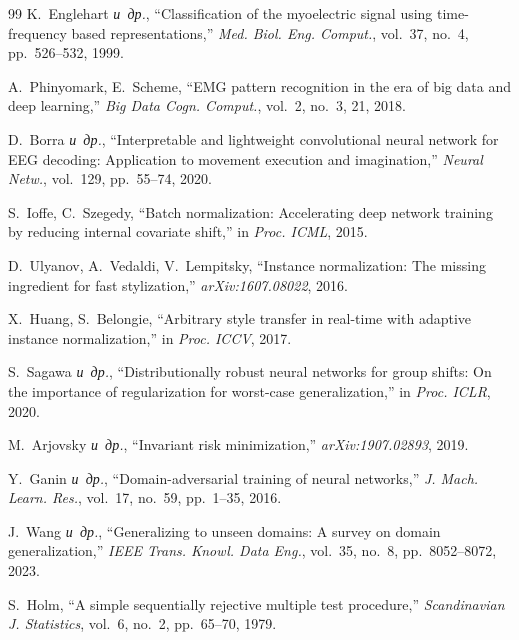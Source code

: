 \documentclass[conference]{IEEEtran}
\newcommand{\etal}{\mbox{\textit{и~др.}}}
\begin{document}
\begin{thebibliography}{99}
K.~Englehart \etal, ``Classification of the myoelectric signal using time-frequency based representations,'' \textit{Med. Biol. Eng. Comput.}, vol.~37, no.~4, pp.~526--532, 1999.

A.~Phinyomark, E.~Scheme, ``EMG pattern recognition in the era of big data and deep learning,'' \textit{Big Data Cogn. Comput.}, vol.~2, no.~3, 21, 2018.

D.~Borra \etal, ``Interpretable and lightweight convolutional neural network for EEG decoding: Application to movement execution and imagination,'' \textit{Neural Netw.}, vol.~129, pp.~55--74, 2020.

S.~Ioffe, C.~Szegedy, ``Batch normalization: Accelerating deep network training by reducing internal covariate shift,'' in \textit{Proc. ICML}, 2015.

D.~Ulyanov, A.~Vedaldi, V.~Lempitsky, ``Instance normalization: The missing ingredient for fast stylization,'' \textit{arXiv:1607.08022}, 2016.

X.~Huang, S.~Belongie, ``Arbitrary style transfer in real-time with adaptive instance normalization,'' in \textit{Proc. ICCV}, 2017.

S.~Sagawa \etal, ``Distributionally robust neural networks for group shifts: On the importance of regularization for worst-case generalization,'' in \textit{Proc. ICLR}, 2020.

M.~Arjovsky \etal, ``Invariant risk minimization,'' \textit{arXiv:1907.02893}, 2019.

Y.~Ganin \etal, ``Domain-adversarial training of neural networks,'' \textit{J. Mach. Learn. Res.}, vol.~17, no.~59, pp.~1--35, 2016.

J.~Wang \etal, ``Generalizing to unseen domains: A survey on domain generalization,'' \textit{IEEE Trans. Knowl. Data Eng.}, vol.~35, no.~8, pp.~8052--8072, 2023.

S.~Holm, ``A simple sequentially rejective multiple test procedure,'' \textit{Scandinavian J. Statistics}, vol.~6, no.~2, pp.~65--70, 1979.

\end{thebibliography}
\end{document}

